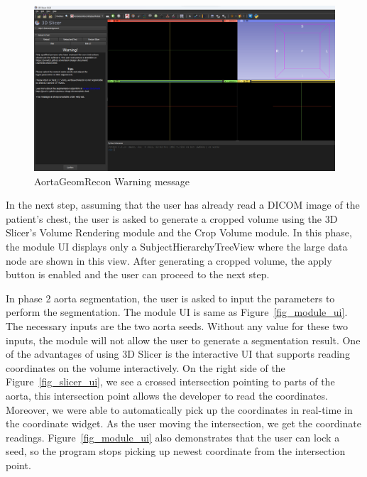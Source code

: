 \begin{figure}[H]
    \centering
    \includegraphics[width=\textwidth]{figures/AGR/AGR_warning.png}
    \caption[AortaGeomRecon Warning message]{AortaGeomRecon Warning message}
    \label{fig_agr_warning}
\end{figure}

In the next step, assuming that the user has already read a DICOM image of the patient's chest, the user is asked to generate a cropped volume using the 3D Slicer's Volume Rendering module and the Crop Volume module. In this phase, the module UI displays only a SubjectHierarchyTreeView where the large data node are shown in this view. After generating a cropped volume, the apply button is enabled and the user can proceed to the next step.

In phase 2 aorta segmentation, the user is asked to input the parameters to perform the segmentation. The module UI is same as Figure~\ref{fig_module_ui}. The necessary inputs are the two aorta seeds. Without any value for these two inputs, the module will not allow the user to generate a segmentation result. One of the advantages of using 3D Slicer is the interactive UI that supports reading coordinates on the volume interactively. On the right side of the Figure~\ref{fig_slicer_ui}, we see a crossed intersection pointing to parts of the aorta, this intersection point allows the developer to read the coordinates. Moreover, we were able to automatically pick up the coordinates in real-time in the coordinate widget. As the user moving the intersection, we get the coordinate readings. Figure~\ref{fig_module_ui} also demonstrates that the user can lock a seed, so the program stops picking up newest coordinate from the intersection point.
